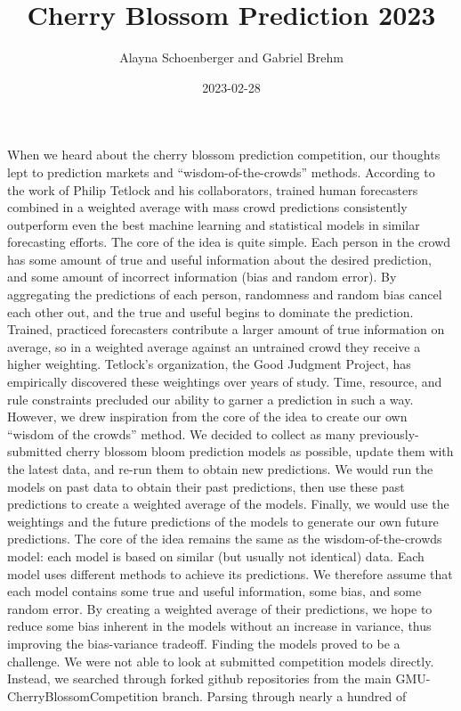 \documentclass[
]{article}
\title{Cherry Blossom Prediction 2023}
\author{Alayna Schoenberger and Gabriel Brehm}
\date{2023-02-28}
\begin{document}
\maketitle

When we heard about the cherry blossom prediction competition, our
thoughts lept to prediction markets and ``wisdom-of-the-crowds''
methods. According to the work of Philip Tetlock and his collaborators,
trained human forecasters combined in a weighted average with mass crowd
predictions consistently outperform even the best machine learning and
statistical models in similar forecasting efforts. The core of the idea
is quite simple. Each person in the crowd has some amount of true and
useful information about the desired prediction, and some amount of
incorrect information (bias and random error). By aggregating the
predictions of each person, randomness and random bias cancel each other
out, and the true and useful begins to dominate the prediction. Trained,
practiced forecasters contribute a larger amount of true information on
average, so in a weighted average against an untrained crowd they
receive a higher weighting. Tetlock's organization, the Good Judgment
Project, has empirically discovered these weightings over years of
study. Time, resource, and rule constraints precluded our ability to
garner a prediction in such a way. However, we drew inspiration from the
core of the idea to create our own ``wisdom of the crowds'' method. We
decided to collect as many previously-submitted cherry blossom bloom
prediction models as possible, update them with the latest data, and
re-run them to obtain new predictions. We would run the models on past
data to obtain their past predictions, then use these past predictions
to create a weighted average of the models. Finally, we would use the
weightings and the future predictions of the models to generate our own
future predictions. The core of the idea remains the same as the
wisdom-of-the-crowds model: each model is based on similar (but usually
not identical) data. Each model uses different methods to achieve its
predictions. We therefore assume that each model contains some true and
useful information, some bias, and some random error. By creating a
weighted average of their predictions, we hope to reduce some bias
inherent in the models without an increase in variance, thus improving
the bias-variance tradeoff. Finding the models proved to be a challenge.
We were not able to look at submitted competition models directly.
Instead, we searched through forked github repositories from the main
GMU-CherryBlossomCompetition branch. Parsing through nearly a hundred of
\end{document}
